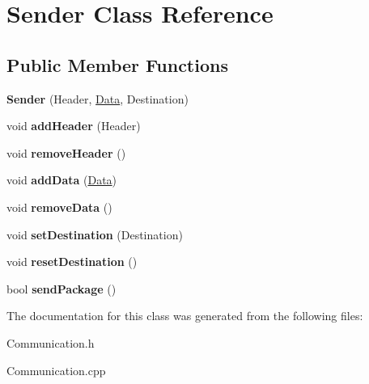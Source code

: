 \hypertarget{classSender}{\section{Sender Class Reference}
\label{classSender}
}
\subsection*{Public Member Functions}
\begin{DoxyCompactItemize}
\item 
\hypertarget{classSender_aa70027ddd77f43ff7c495f61d32357fe}{{\bfseries Sender} (Header, \hyperlink{classData}{Data}, Destination)}\label{classSender_aa70027ddd77f43ff7c495f61d32357fe}

\item 
\hypertarget{classSender_aaad9be7cc8e3fac6fc37adf61dfe5674}{void {\bfseries add\-Header} (Header)}\label{classSender_aaad9be7cc8e3fac6fc37adf61dfe5674}

\item 
\hypertarget{classSender_ac818fbb0dc111ab9190c70ae584661fb}{void {\bfseries remove\-Header} ()}\label{classSender_ac818fbb0dc111ab9190c70ae584661fb}

\item 
\hypertarget{classSender_a1b118e8f497778a99ed305a1d4476020}{void {\bfseries add\-Data} (\hyperlink{classData}{Data})}\label{classSender_a1b118e8f497778a99ed305a1d4476020}

\item 
\hypertarget{classSender_ab5f5921d2ca1aac87aab8848cfb34fbf}{void {\bfseries remove\-Data} ()}\label{classSender_ab5f5921d2ca1aac87aab8848cfb34fbf}

\item 
\hypertarget{classSender_aa9d2668a85f85daf4c5c7e45a1b71a79}{void {\bfseries set\-Destination} (Destination)}\label{classSender_aa9d2668a85f85daf4c5c7e45a1b71a79}

\item 
\hypertarget{classSender_a14fd132345bad96649d9189501fec0f1}{void {\bfseries reset\-Destination} ()}\label{classSender_a14fd132345bad96649d9189501fec0f1}

\item 
\hypertarget{classSender_a6136f7dbc2b07e6eb20123dea07a022e}{bool {\bfseries send\-Package} ()}\label{classSender_a6136f7dbc2b07e6eb20123dea07a022e}

\end{DoxyCompactItemize}


The documentation for this class was generated from the following files\-:\begin{DoxyCompactItemize}
\item 
Communication.\-h\item 
Communication.\-cpp\end{DoxyCompactItemize}
